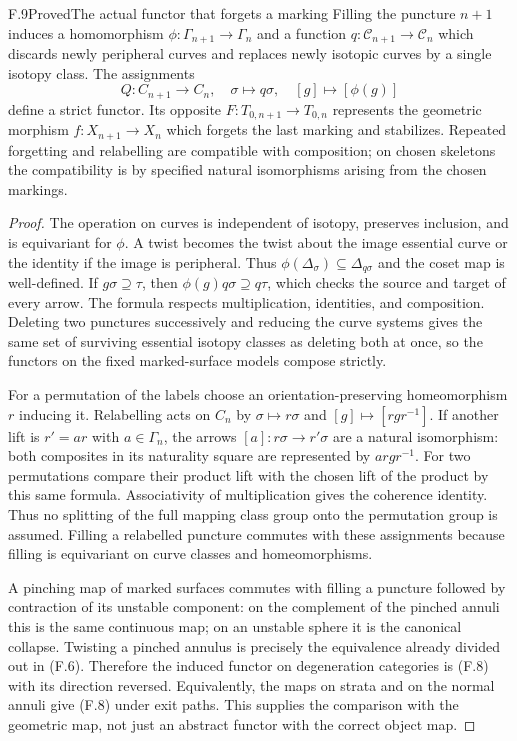 \begin{statement}{F.9}{Proved}{The actual functor that forgets a marking}
Filling the puncture $n+1$ induces a homomorphism
$\phi:\Gamma_{n+1}\to\Gamma_n$ and a function
$q:\mathcal C_{n+1}\to\mathcal C_n$ which discards newly peripheral
curves and replaces newly isotopic curves by a single isotopy class.
The assignments
\[
 Q:C_{n+1}\longrightarrow C_n,
 \quad\sigma\longmapsto q\sigma,\quad[g]\longmapsto[\phi(g)]
                                                               \tag{F.8}
\]
define a strict functor.  Its opposite
$F:T_{0,n+1}\to T_{0,n}$ represents the geometric morphism
$f:X_{n+1}\to X_n$ which forgets the last marking and stabilizes.
Repeated forgetting and relabelling are compatible with composition;
on chosen skeletons the compatibility is by specified natural
isomorphisms arising from the chosen markings.
\end{statement}
\begin{proof}
The operation on curves is independent of isotopy, preserves inclusion,
and is equivariant for $\phi$.  A twist becomes the twist about the
image essential curve or the identity if the image is peripheral.
Thus $\phi(\Delta_\sigma)\subseteq\Delta_{q\sigma}$ and the coset map
is well-defined.  If $g\sigma\supseteq\tau$, then
$\phi(g)q\sigma\supseteq q\tau$, which checks the source and target
of every arrow.  The formula respects multiplication, identities, and
composition.  Deleting two punctures successively and reducing the
curve systems gives the same set of surviving essential isotopy classes
as deleting both at once, so the functors on the fixed marked-surface
models compose strictly.

For a permutation of the labels choose an orientation-preserving
homeomorphism $r$ inducing it.  Relabelling acts on $C_n$ by
$\sigma\mapsto r\sigma$ and $[g]\mapsto[rgr^{-1}]$.
If another lift is $r'=ar$ with $a\in\Gamma_n$, the arrows
$[a]:r\sigma\to r'\sigma$ are a natural isomorphism: both composites
in its naturality square are represented by $a r g r^{-1}$.
For two permutations compare their product lift with the chosen lift
of the product by this same formula.  Associativity of multiplication
gives the coherence identity.  Thus no splitting of the full mapping
class group onto the permutation group is assumed.  Filling a relabelled
puncture commutes with these assignments because filling is equivariant
on curve classes and homeomorphisms.

A pinching map of marked surfaces commutes with filling a puncture
followed by contraction of its unstable component: on the complement
of the pinched annuli this is the same continuous map; on an unstable
sphere it is the canonical collapse.  Twisting a pinched annulus is
precisely the equivalence already divided out in (F.6).  Therefore the
induced functor on degeneration categories is (F.8) with its direction
reversed.  Equivalently, the maps on strata and on the normal annuli
give (F.8) under exit paths.  This supplies the comparison with the
geometric map, not just an abstract functor with the correct object map.
\end{proof}

